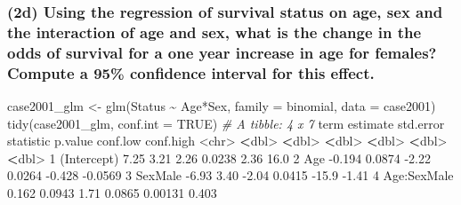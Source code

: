 \documentclass[
]{article}
\newenvironment{Shaded}{\begin{snugshade}}{\end{snugshade}}
\newcommand{\AttributeTok}[1]{\textcolor[rgb]{0.77,0.63,0.00}{#1}}
\newcommand{\CommentTok}[1]{\textcolor[rgb]{0.56,0.35,0.01}{\textit{#1}}}
\newcommand{\ConstantTok}[1]{\textcolor[rgb]{0.00,0.00,0.00}{#1}}
\newcommand{\DecValTok}[1]{\textcolor[rgb]{0.00,0.00,0.81}{#1}}
\newcommand{\ErrorTok}[1]{\textcolor[rgb]{0.64,0.00,0.00}{\textbf{#1}}}
\newcommand{\FloatTok}[1]{\textcolor[rgb]{0.00,0.00,0.81}{#1}}
\newcommand{\FunctionTok}[1]{\textcolor[rgb]{0.00,0.00,0.00}{#1}}
\newcommand{\NormalTok}[1]{#1}
\newcommand{\OtherTok}[1]{\textcolor[rgb]{0.56,0.35,0.01}{#1}}
\newcommand{\SpecialCharTok}[1]{\textcolor[rgb]{0.00,0.00,0.00}{#1}}
\begin{document}
\hypertarget{d-using-the-regression-of-survival-status-on-age-sex-and-the-interaction-of-age-and-sex-what-is-the-change-in-the-odds-of-survival-for-a-one-year-increase-in-age-for-females-compute-a-95-confidence-interval-for-this-effect.}{%
\subsubsection{(2d) Using the regression of survival status on age, sex
and the interaction of age and sex, what is the change in the odds of
survival for a one year increase in age for females? Compute a 95\%
confidence interval for this
effect.}\label{d-using-the-regression-of-survival-status-on-age-sex-and-the-interaction-of-age-and-sex-what-is-the-change-in-the-odds-of-survival-for-a-one-year-increase-in-age-for-females-compute-a-95-confidence-interval-for-this-effect.}}

\begin{Shaded}
\begin{Highlighting}[]
\NormalTok{case2001\_glm }\OtherTok{\textless{}{-}} \FunctionTok{glm}\NormalTok{(Status }\SpecialCharTok{\textasciitilde{}}\NormalTok{ Age}\SpecialCharTok{*}\NormalTok{Sex, }\AttributeTok{family =}\NormalTok{ binomial, }\AttributeTok{data =}\NormalTok{ case2001)}
\FunctionTok{tidy}\NormalTok{(case2001\_glm, }\AttributeTok{conf.int =} \ConstantTok{TRUE}\NormalTok{)}
\CommentTok{\# A tibble: 4 x 7}
\NormalTok{  term        estimate std.error statistic p.value  conf.low conf.high}
  \SpecialCharTok{\textless{}}\NormalTok{chr}\SpecialCharTok{\textgreater{}}          \ErrorTok{\textless{}}\NormalTok{dbl}\SpecialCharTok{\textgreater{}}     \ErrorTok{\textless{}}\NormalTok{dbl}\SpecialCharTok{\textgreater{}}     \ErrorTok{\textless{}}\NormalTok{dbl}\SpecialCharTok{\textgreater{}}   \ErrorTok{\textless{}}\NormalTok{dbl}\SpecialCharTok{\textgreater{}}     \ErrorTok{\textless{}}\NormalTok{dbl}\SpecialCharTok{\textgreater{}}     \ErrorTok{\textless{}}\NormalTok{dbl}\SpecialCharTok{\textgreater{}}
\DecValTok{1}\NormalTok{ (Intercept)    }\FloatTok{7.25}     \FloatTok{3.21}        \FloatTok{2.26}  \FloatTok{0.0238}   \FloatTok{2.36}      \FloatTok{16.0}   
\DecValTok{2}\NormalTok{ Age           }\SpecialCharTok{{-}}\FloatTok{0.194}    \FloatTok{0.0874}     \SpecialCharTok{{-}}\FloatTok{2.22}  \FloatTok{0.0264}  \SpecialCharTok{{-}}\FloatTok{0.428}     \SpecialCharTok{{-}}\FloatTok{0.0569}
\DecValTok{3}\NormalTok{ SexMale       }\SpecialCharTok{{-}}\FloatTok{6.93}     \FloatTok{3.40}       \SpecialCharTok{{-}}\FloatTok{2.04}  \FloatTok{0.0415} \SpecialCharTok{{-}}\FloatTok{15.9}       \SpecialCharTok{{-}}\FloatTok{1.41}  
\DecValTok{4}\NormalTok{ Age}\SpecialCharTok{:}\NormalTok{SexMale    }\FloatTok{0.162}    \FloatTok{0.0943}      \FloatTok{1.71}  \FloatTok{0.0865}   \FloatTok{0.00131}    \FloatTok{0.403} 
\end{Highlighting}
\end{Shaded}
\end{document}

